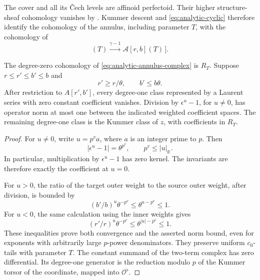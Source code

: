 The cover and all its \v Cech levels are affinoid perfectoid.
Their higher structure-sheaf cohomology vanishes by
\cite[Proposition~8.8]{ScholzeDiamonds17}.
Kummer descent and \eqref{eq:analytic-cyclic} therefore identify the
cohomology of the annulus, including parameter \(T\), with the
cohomology of
\begin{equation}
 [\,\mathcal A[r,b](T)
          \xrightarrow{\gamma-1}\mathcal A[r,b](T)\,].
 \label{eq:analytic-annulus-complex}
\end{equation}

\begin{lemma}
\label{lem:annulus-restriction}
The degree-zero cohomology of
\eqref{eq:analytic-annulus-complex} is \(R_T\).
Suppose \(r\leq r'\leq b'\leq b\) and
\begin{equation}
 r'\geq r/\theta,\qquad b'\leq b\theta.
 \label{eq:analytic-radius-gap}
\end{equation}
After restriction to \(A[r',b']\), every degree-one class represented
by a Laurent series with zero constant coefficient vanishes.  Division by
\(\epsilon^u-1\), for \(u\neq0\), has operator norm at most one
between the indicated weighted coefficient spaces.  The remaining
degree-one class is the Kummer class of \(z\), with coefficients in
\(R_T\).
\end{lemma}

\begin{proof}
For \(u\neq0\), write \(u=p^v a\), where \(a\) is an integer prime to
\(p\).  Then
\begin{equation}
 |\epsilon^u-1|=\theta^{p^v},
 \qquad p^v\leq |u|_{\mathbb R}.
 \label{eq:analytic-epsilon}
\end{equation}
In particular, multiplication by \(\epsilon^u-1\) has zero kernel.
The invariants are therefore exactly the coefficient at \(u=0\).

For \(u>0\), the ratio of the target outer weight to the source
outer weight, after division, is bounded by
\[
 (b'/b)^u\theta^{-p^v}
 \leq\theta^{u-p^v}\leq1.
\]
For \(u<0\), the same calculation using the inner weights gives
\[
 (r'/r)^u\theta^{-p^v}
 \leq\theta^{|u|-p^v}\leq1.
\]
These inequalities prove both convergence and the asserted norm
bound, even for exponents with arbitrarily large \(p\)-power
denominators.  They preserve uniform \(c_0\)-tails with parameter
\(T\).  The constant summand of the two-term complex has zero
differential.  Its degree-one generator is the reduction modulo
\(p\) of the Kummer torsor of the coordinate, mapped into
\(\mathcal O^\flat\).
\end{proof}

